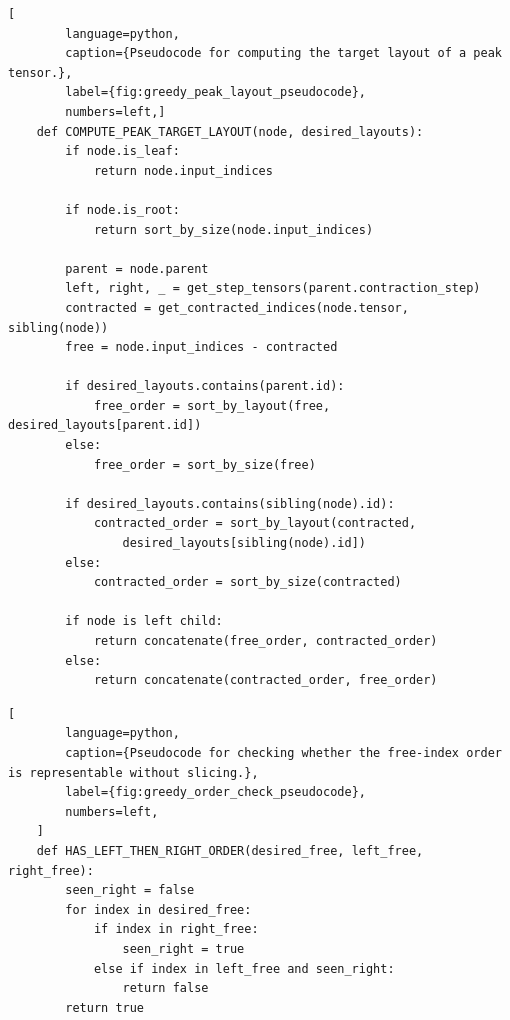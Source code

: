 \begin{center}
    \begin{lstlisting}[
        language=python,
        caption={Pseudocode for computing the target layout of a peak tensor.},
        label={fig:greedy_peak_layout_pseudocode},
        numbers=left,]
    def COMPUTE_PEAK_TARGET_LAYOUT(node, desired_layouts):
        if node.is_leaf:
            return node.input_indices

        if node.is_root:
            return sort_by_size(node.input_indices)

        parent = node.parent
        left, right, _ = get_step_tensors(parent.contraction_step)
        contracted = get_contracted_indices(node.tensor, sibling(node))
        free = node.input_indices - contracted

        if desired_layouts.contains(parent.id):
            free_order = sort_by_layout(free, desired_layouts[parent.id])
        else:
            free_order = sort_by_size(free)

        if desired_layouts.contains(sibling(node).id):
            contracted_order = sort_by_layout(contracted, 
                desired_layouts[sibling(node).id])
        else:
            contracted_order = sort_by_size(contracted)

        if node is left child:
            return concatenate(free_order, contracted_order)
        else:
            return concatenate(contracted_order, free_order)
    \end{lstlisting}
\end{center}

\begin{center}
    \begin{lstlisting}[
        language=python,
        caption={Pseudocode for checking whether the free-index order is representable without slicing.},
        label={fig:greedy_order_check_pseudocode},
        numbers=left,
    ]
    def HAS_LEFT_THEN_RIGHT_ORDER(desired_free, left_free, right_free):
        seen_right = false
        for index in desired_free:
            if index in right_free:
                seen_right = true
            else if index in left_free and seen_right:
                return false
        return true
    \end{lstlisting}
\end{center}

